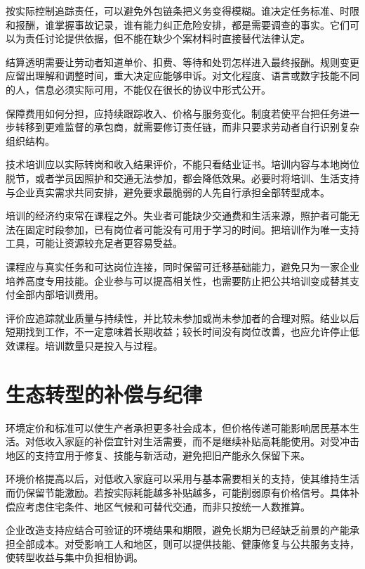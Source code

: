\documentclass[UTF8,fontset=fandol,zihao=-4,oneside,openany]{ctexbook}
\begin{document}
\label{arg:P272}
按实际控制追踪责任，可以避免外包链条把义务变得模糊。谁决定任务标准、时限和报酬，谁掌握事故记录，谁有能力纠正危险安排，都是需要调查的事实。它们可以为责任讨论提供依据，但不能在缺少个案材料时直接替代法律认定。

结算透明需要让劳动者知道单价、扣费、等待和处罚怎样进入最终报酬。规则变更应留出理解和调整时间，重大决定应能够申诉。对文化程度、语言或数字技能不同的人，信息必须实际可用，不能仅在很长的协议中形式公开。

保障费用如何分担，应持续跟踪收入、价格与服务变化。制度若使平台把任务进一步转移到更难监督的承包商，就需要修订责任链，而非只要求劳动者自行识别复杂组织结构。

技术培训应以实际转岗和收入结果评价，不能只看结业证书。培训内容与本地岗位脱节，或者学员因照护和交通无法参加，都会降低效果。必要时将培训、生活支持与企业真实需求共同安排，避免要求最脆弱的人先自行承担全部转型成本。

\label{arg:P273}
培训的经济约束常在课程之外。失业者可能缺少交通费和生活来源，照护者可能无法在固定时段参加，已有岗位者可能没有可用于学习的时间。把培训作为唯一支持工具，可能让资源较充足者更容易受益。

课程应与真实任务和可达岗位连接，同时保留可迁移基础能力，避免只为一家企业培养高度专用技能。企业参与可以提高相关性，也需要防止把公共培训变成替其支付全部内部培训费用。

评价应追踪就业质量与持续性，并比较未参加或尚未参加者的合理对照。结业以后短期找到工作，不一定意味着长期收益；较长时间没有岗位改善，也应允许停止低效课程。培训数量只是投入与过程。

\section{生态转型的补偿与纪律}
环境定价和标准可以使生产者承担更多社会成本，但价格传递可能影响居民基本生活。对低收入家庭的补偿宜针对生活需要，而不是继续补贴高耗能使用。对受冲击地区的支持宜用于修复、技能与新活动，避免把旧产能永久保留下来。

\label{arg:P274}
环境价格提高以后，对低收入家庭可以采用与基本需要相关的支持，使其维持生活而仍保留节能激励。若按实际耗能越多补贴越多，可能削弱原有价格信号。具体补偿应考虑住宅条件、地区气候和可替代交通，而非只按统一人数推算。

企业改造支持应结合可验证的环境结果和期限，避免长期为已经缺乏前景的产能承担全部成本。对受影响工人和地区，则可以提供技能、健康修复与公共服务支持，使转型收益与集中负担相协调。
\end{document}
